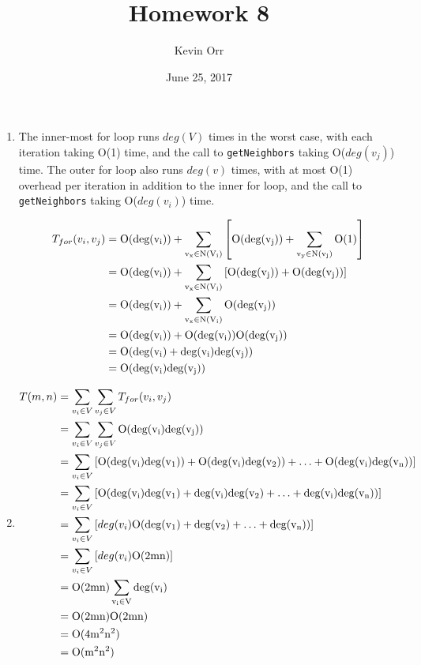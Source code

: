 \documentclass[11pt]{article}
\author{Kevin Orr}
\date{June 25, 2017}
\title{Homework 8}
\begin{document}
\maketitle
\begin{enumerate}
\item The inner-most for loop runs \(deg(V)\) times in the worst case, with each iteration taking
O(1) time, and the call to \texttt{getNeighbors} taking O(\(deg(v_j)\)) time. The outer for loop also
runs \(deg(v)\) times, with at most O(1) overhead per iteration in addition to the inner for
loop, and the call to \texttt{getNeighbors} taking O(\(deg(v_i)\)) time.

\begin{equation*}
\begin{align*}
  T_{for}(v_i, v_j) &= \rm O(deg(v_i)) + \sum_{v_x\in N(V_i)} \left[ \rm O(deg(v_j)) + \sum_{v_y\in N(v_j)} \rm O(1) \right] \\
                    &= \rm O(deg(v_i)) + \sum_{v_x\in N(V_i)} \left[ \rm O(deg(v_j)) + \rm O(deg(v_j)) \right] \\
                    &= \rm O(deg(v_i)) + \sum_{v_x\in N(V_i)} \rm O(deg(v_j)) \\
                    &= \rm O(deg(v_i)) + \rm O(deg(v_i)) \rm O(deg(v_j)) \\
                    &= \rm O(deg(v_i) + deg(v_i) deg(v_j)) \\
                    &= \rm O(deg(v_i) deg(v_j))
\end{align*}
\end{equation*}

\item \begin{equation*}
\begin{align*}
  T(m, n) &= \sum_{v_i \in V} \sum_{v_j \in V} T_{for}(v_i, v_j) \\
          &= \sum_{v_i \in V} \sum_{v_j \in V} \rm O(deg(v_i) deg(v_j)) \\
          &= \sum_{v_i \in V} \left[ \rm O(deg(v_i)deg(v_1)) + \rm O(deg(v_i)deg(v_2)) + \ldots + \rm O(deg(v_i)deg(v_n)) \right] \\
          &= \sum_{v_i \in V} \left[ \rm O(deg(v_i)deg(v_1) + deg(v_i)deg(v_2) + \ldots + deg(v_i)deg(v_n)) \right] \\
          &= \sum_{v_i \in V} \left[ deg(v_i) \rm O(deg(v_1) + deg(v_2) + \ldots + deg(v_n)) \right] \\
          &= \sum_{v_i \in V} \left[ deg(v_i) \rm O(2mn) \right] \\
          &= \rm O(2mn) \sum_{v_i \in V} deg(v_i) \\
          &= \rm O(2mn) \rm O(2mn) \\
          &= \rm O(4m^2n^2) \\
          &= \rm O(m^2n^2)
\end{align*}
\end{equation*}
\end{enumerate}
\end{document}

